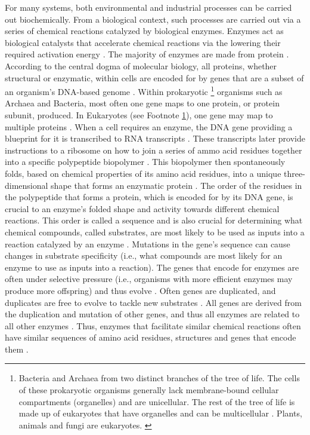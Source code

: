 For many systems, both environmental and industrial processes can be carried out biochemically. From a biological context, such processes are carried out via a series of chemical reactions catalyzed by biological enzymes. Enzymes act as biological catalysts that accelerate chemical reactions via the lowering their required activation energy \cite{segel1975enzyme}. The majority of enzymes are made from protein \cite{kruger1982self}. According to the central dogma of molecular biology, all proteins, whether structural or enzymatic, within cells are encoded for by genes that are a subset of an organism's DNA-based genome \cite{crick1970central}. Within prokaryotic \footnote{Bacteria and Archaea from two distinct branches of the tree of life. The cells of these prokaryotic organisms generally\cite{nevo2007thylakoid,cameron2013biogenesis,bazylinski2004magnetosome,van2008combined,adams2000heterocyst,o2000biofilm} lack membrane-bound cellular compartments (organelles) and are unicellular. The rest of the tree of life is made up of eukaryotes that have organelles and can be multicellular \cite{baldauf2003deep}. Plants, animals and fungi are eukaryotes. \label{types-of-cells}} organisms such as Archaea and Bacteria, most often one gene maps to one protein, or protein subunit, produced. In Eukaryotes (see Footnote \ref{types-of-cells}), one gene may map to multiple proteins \cite{black2003mechanisms}. When a cell requires an enzyme, the DNA gene providing a blueprint for it is transcribed to RNA transcripts \cite{crick1970central}. These transcripts later provide instructions to a ribosome on how to join a series of ammo acid residues together into a specific polypeptide biopolymer \cite{crick1970central}. This biopolymer then spontaneously folds, based on chemical properties of its amino acid residues, into a unique three-dimensional shape that forms an enzymatic protein \cite{fersht1992folding}. The order of the residues in the polypeptide that forms a protein, which is encoded for by its DNA gene, is crucial to an enzyme's folded shape and activity towards different chemical reactions. This order is called a sequence and is also crucial for determining what chemical compounds, called substrates, are most likely to be used as inputs into a reaction catalyzed by an enzyme \cite{fersht1992folding,fersht1999structure}. Mutations in the gene's sequence can cause changes in substrate specificity (i.e., what compounds are most likely for an enzyme to use as inputs into a reaction). The genes that encode for enzymes are often under selective pressure (i.e., organisms with more efficient enzymes may produce more offspring) and thus evolve \cite{zhang2003evolution,whelan2001general}. Often genes are duplicated, and duplicates are free to evolve to tackle new substrates \cite{zhang2003evolution}. All genes are derived from the duplication and mutation of other genes, and thus all enzymes are related to all other enzymes \cite{zhang2003evolution,whelan2001general}. Thus, enzymes that facilitate similar chemical reactions often \cite{galperin1998analogous} have similar sequences of amino acid residues, structures and genes that encode them \cite{zhang2003evolution}.


